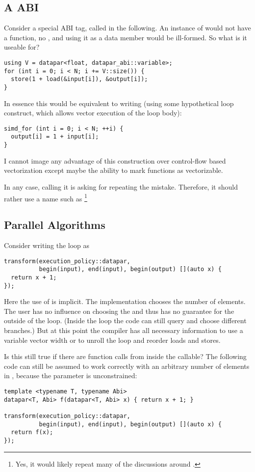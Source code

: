 \subsection{A  ABI}
Consider a special ABI tag, called  in the following.
An instance of \datapar[<T, variable>] would not have a  function, no , and using it as a data member would be ill-formed.
So what is it useable for?
\smallskip\begin{lstlisting}[style=Vc]
using V = datapar<float, datapar_abi::variable>;
for (int i = 0; i < N; i += V::size()) {
  store(1 + load(&input[i]), &output[i]);
}
\end{lstlisting}
In essence this would be equivalent to writing (using some hypothetical  loop construct, which allows vector execution of the loop body):
\smallskip\begin{lstlisting}[style=Vc]
simd_for (int i = 0; i < N; ++i) {
  output[i] = 1 + input[i];
}
\end{lstlisting}

I cannot image any advantage of this construction over control-flow based vectorization except maybe the ability to mark functions as vectorizable.

In any case, calling it \datapar[<T, variable>] is asking for repeating the \std{} mistake.
Therefore, it should rather use a name such as \footnote{Yes, it would likely repeat many of the discussions around .}

\subsection{Parallel Algorithms}
Consider writing the loop as
\smallskip\begin{lstlisting}[style=Vc]
transform(execution_policy::datapar,
          begin(input), end(input), begin(output) [](auto x) {
  return x + 1;
});
\end{lstlisting}
Here the use of \datapar is implicit.
The implementation chooses the number of elements.
The user has no influence on choosing the  and thus has no guarantee for the  outside of the loop.
(Inside the loop the code can still query  and choose different branches.)
But at this point the compiler has all necessary information to use a variable vector width or to unroll the loop and reorder loads and stores.

Is this still true if there are function calls from inside the callable?
The following code can still be assumed to work correctly with an arbitrary number of elements in \datapar, because the  parameter is unconstrained:
\smallskip\begin{lstlisting}[style=Vc]
template <typename T, typename Abi>
datapar<T, Abi> f(datapar<T, Abi> x) { return x + 1; }

transform(execution_policy::datapar,
          begin(input), end(input), begin(output) [](auto x) {
  return f(x);
});
\end{lstlisting}

